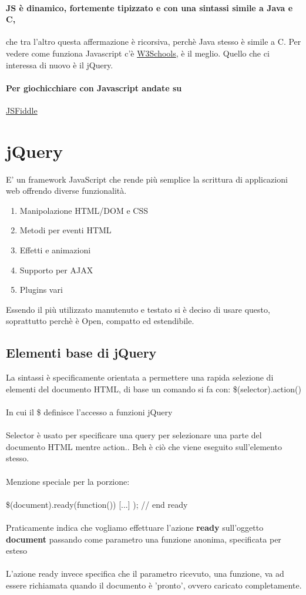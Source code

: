 \documentclass[12pt, a4paper, openany, twoside]{book}
\begin{document}
\paragraph{JS è dinamico, fortemente tipizzato e con una sintassi simile a Java e
C,} che tra l'altro questa affermazione è ricorsiva, perchè Java stesso è simile a C.
Per vedere come funziona Javascript c'è \href{https://www.w3schools.com/js/}{W3Schools}, 
è il meglio.
Quello che ci interessa di nuovo è il jQuery.
\paragraph{Per giochicchiare con Javascript andate su} 
\href{https://jsfiddle.net/gvizzari/wup42mox/4/}{JSFiddle}
\section{jQuery}
E' un framework JavaScript che rende più semplice la scrittura di applicazioni
web offrendo diverse funzionalità. 
\begin{enumerate}
	\item Manipolazione HTML/DOM e CSS
	\item Metodi per eventi HTML
	\item Effetti e animazioni
	\item Supporto per AJAX
	\item Plugins vari
\end{enumerate}
Essendo il più utilizzato manutenuto e testato si è deciso di usare questo, soprattutto
perchè è Open, compatto ed estendibile. 
\subsection{Elementi base di jQuery}
La sintassi è specificamente orientata a permettere una rapida selezione di elementi
del documento HTML, di base un comando si fa con:
\$(selector).action() \\ \\
In cui il \$ definisce l'accesso a funzioni jQuery \\ \\
Selector è usato per specificare una query per selezionare una parte del documento
HTML mentre action.. Beh è ciò che viene eseguito sull'elemento stesso.
\\ \\
Menzione speciale per la porzione: \\ \\
\$(document).ready(function()){
	[...]
}); // end ready \\ \\
Praticamente indica che vogliamo effettuare l'azione \textbf{ready} sull'oggetto
\textbf{document} passando come parametro una funzione anonima, specificata per 
esteso\\ \\
L'azione ready invece specifica che il parametro ricevuto, una funzione, va
ad essere richiamata quando il documento è 'pronto', ovvero caricato completamente.
\end{document}
